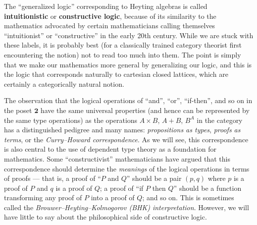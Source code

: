 \documentclass{book}
\def\tv{\mathbf{2}}
\begin{document}
The ``generalized logic'' corresponding to Heyting algebras is called \textbf{intuitionistic} or \textbf{constructive logic}, because of its similarity to the mathematics advocated by certain mathematicians calling themselves ``intuitionist'' or ``constructive'' in the early 20th century.
While we are stuck with these labels, it is probably best (for a classically trained category theorist first encountering the notion) not to read too much into them.
The point is simply that we make our mathematics more general by generalizing our logic, and this is the logic that corresponds naturally to cartesian closed lattices, which are certainly a categorically natural notion.

The observation that the logical operations of ``and'', ``or'', ``if-then'', and so on in the poset $\tv$ have the same universal properties (and hence can be represented by the same type operations) as the operations $A\times B$, $A+B$, $B^A$ in the category \bSet has a distinguished pedigree and many names: \emph{propositions as types}, \emph{proofs as terms}, or the \emph{Curry--Howard correspondence}.
As we will see, this correspondence is also central to the use of dependent type theory as a foundation for mathematics.
Some ``constructivist'' mathematicians have argued that this correspondence should determine the \emph{meanings} of the logical operations in terms of proofs --- that is, a proof of ``$P$ and $Q$'' should be a pair $(p,q)$ where $p$ is a proof of $P$ and $q$ is a proof of $Q$; a proof of ``if $P$ then $Q$'' should be a function transforming any proof of $P$ into a proof of $Q$; and so on.
This is sometimes called the \emph{Brouwer--Heyting--Kolmogorov (BHK) interpretation}.
However, we will have little to say about the philosophical side of constructive logic.
\end{document}
